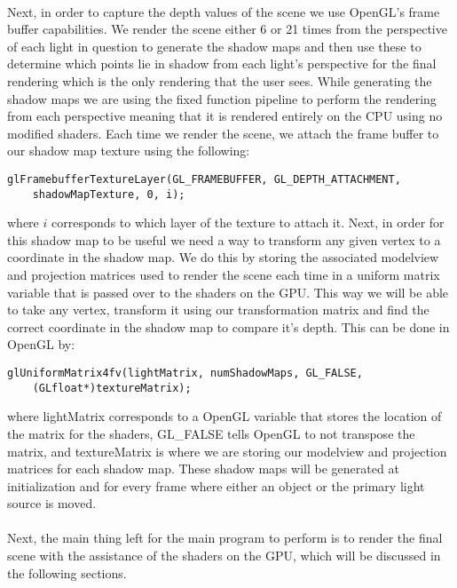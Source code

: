 \paragraph{}
Next, in order to capture the depth values of the scene we use OpenGL's frame buffer capabilities.  We render the scene either 6 or 21 times from the perspective of each light in question to generate the shadow maps and then use these to determine which points lie in shadow from each light's perspective for the final rendering which is the only rendering that the user sees.  While generating the shadow maps we are using the fixed function pipeline to perform the rendering from each perspective meaning that it is rendered entirely on the CPU using no modified shaders.  Each time we render the scene, we attach the frame buffer to our shadow map texture using the following:

\begin{lstlisting}
glFramebufferTextureLayer(GL_FRAMEBUFFER, GL_DEPTH_ATTACHMENT, 
	shadowMapTexture, 0, i);
\end{lstlisting}

where $i$ corresponds to which layer of the texture to attach it.  Next, in order for this shadow map to be useful we need a way to transform any given vertex to a coordinate in the shadow map.  We do this by storing the associated modelview and projection matrices used to render the scene each time in a uniform matrix variable that is passed over to the shaders on the GPU.  This way we will be able to take any vertex, transform it using our transformation matrix and find the correct coordinate in the shadow map to compare it's depth.  This can be done in OpenGL by:

\begin{lstlisting}
glUniformMatrix4fv(lightMatrix, numShadowMaps, GL_FALSE, 
	(GLfloat*)textureMatrix);
\end{lstlisting}

where lightMatrix corresponds to a OpenGL variable that stores the location of the matrix for the shaders, GL\_FALSE tells OpenGL to not transpose the matrix, and textureMatrix is where we are storing our modelview and projection matrices for each shadow map.  These shadow maps will be generated at initialization and for every frame where either an object or the primary light source is moved.

\paragraph{}
Next, the main thing left for the main program to perform is to render the final scene with the assistance of the shaders on the GPU, which will be discussed in the following sections.


